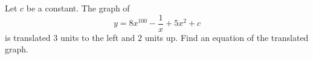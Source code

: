 Let $c$ be a constant. The graph of
\[y=8x^{100}-\dfrac{1}{x}+5x^2+c\]
is translated $3$ units to the left and $2$ units up. Find an equation of the translated graph.
